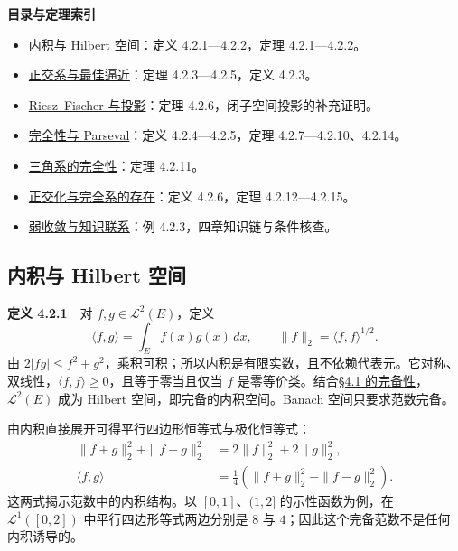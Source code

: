 \documentclass[11pt,a4paper]{article}
\providecommand{\tightlist}{\setlength{\itemsep}{3pt}\setlength{\parskip}{0pt}}
\begin{document}
\textbf{目录与定理索引}

\begin{itemize}
\tightlist
\item
  \hyperref[ch04-s2-ux5185ux79efux4e0e-hilbert-ux7a7aux95f4]{内积与 Hilbert
  空间}：定义 4.2.1---4.2.2，定理 4.2.1---4.2.2。
\item
  \hyperref[ch04-s2-ux6b63ux4ea4ux7cfbux4e0eux6700ux4f73ux903cux8fd1]{正交系与最佳逼近}：定理
  4.2.3---4.2.5，定义 4.2.3。
\item
  \hyperref[ch04-s2-rieszfischer-ux4e0eux6295ux5f71]{Riesz--Fischer
  与投影}：定理 4.2.6，闭子空间投影的补充证明。
\item
  \hyperref[ch04-s2-ux5b8cux5168ux6027ux4e0e-parseval]{完全性与 Parseval}：定义
  4.2.4---4.2.5，定理 4.2.7---4.2.10、4.2.14。
\item
  \hyperref[ch04-s2-ux4e09ux89d2ux7cfbux7684ux5b8cux5168ux6027]{三角系的完全性}：定理
  4.2.11。
\item
  \hyperref[ch04-s2-ux6b63ux4ea4ux5316ux4e0eux5b8cux5168ux7cfbux7684ux5b58ux5728]{正交化与完全系的存在}：定义
  4.2.6，定理 4.2.12---4.2.15。
\item
  \hyperref[ch04-s2-ux5f31ux6536ux655bux4e0eux77e5ux8bc6ux8054ux7cfb]{弱收敛与知识联系}：例
  4.2.3，四章知识链与条件核查。
\end{itemize}

\subsection{内积与 Hilbert
空间}\label{ch04-s2-ux5185ux79efux4e0e-hilbert-ux7a7aux95f4}

\textbf{定义 4.2.1}　对 \(f,g\in\mathcal L^2(E)\)，定义 \[
\langle f,g\rangle=\int_Ef(x)g(x)\,dx,\qquad
\|f\|_2=\langle f,f\rangle^{1/2}.
\] 由
\(2|fg|\le f^2+g^2\)，乘积可积；所以内积是有限实数，且不依赖代表元。它对称、双线性，\(\langle f,f\rangle\ge0\)，且等于零当且仅当
\(f\)
是零等价类。结合\href{https://zj139.github.io/math-notes/notes/c15167148a7e99cbefa5d46f/\#完备性}{§4.1
的完备性}，\(\mathcal L^2(E)\) 成为 Hilbert
空间，即完备的内积空间。Banach 空间只要求范数完备。

由内积直接展开可得平行四边形恒等式与极化恒等式： \[
\begin{aligned}
\|f+g\|_2^2+\|f-g\|_2^2&=2\|f\|_2^2+2\|g\|_2^2,\\
\langle f,g\rangle&=\tfrac14(\|f+g\|_2^2-\|f-g\|_2^2).
\end{aligned}
\] 这两式揭示范数中的内积结构。以 \([0,1]\)、\((1,2]\)
的示性函数为例，在 \(\mathcal L^1([0,2])\) 中平行四边形等式两边分别是
\(8\) 与 \(4\)；因此这个完备范数不是任何内积诱导的。
\end{document}
